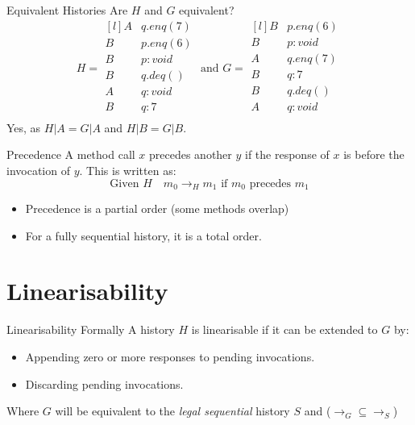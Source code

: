 \begin{examplebox}{Equivalent Histories}
    Are $H$ and $G$ equivalent?
    \[H = \begin{matrix*}[l]
        A & q.enq(7) \\
        B & p.enq(6) \\
        B & p : void \\
        B & q.deq() \\
        A & q: void \\
        B & q: 7 \\
    \end{matrix*} \text{ and } G = \begin{matrix*}[l]
        B & p.enq(6) \\
        B & p : void \\
        A & q.enq(7) \\
        B & q: 7 \\
        B & q.deq() \\
        A & q: void \\
    \end{matrix*}\]
    \tcblower
    Yes, as $H|A = G|A$ and $H|B = G|B$.
\end{examplebox}
\begin{definitionbox}{Precedence}
    A method call $x$ precedes another $y$ if the response of $x$ is before the invocation of $y$. This is written as:
    \[\text{Given } H \quad m_0 \to_H m_1 \text{ if }m_0 \text{ precedes }m_1\]
    \begin{itemize}
        \item Precedence is a partial order (some methods overlap)
        \item For a fully sequential history, it is a total order.
    \end{itemize}
\end{definitionbox}


\section{Linearisability}
\begin{definitionbox}{Linearisability Formally}
    A history $H$ is linearisable if it can be extended to $G$ by:
    \begin{itemize}
        \item Appending zero or more responses to pending invocations.
        \item Discarding pending invocations.
    \end{itemize}
    Where $G$ will be equivalent to the \textit{legal sequential} history $S$ and ($\to_G \subseteq \to_S$)
\end{definitionbox}

